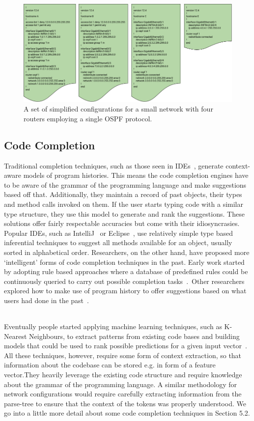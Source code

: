 \begin{figure}[H]
	\centering
	\includegraphics[width=5in]{configexample.png}
	\caption{A set of simplified configurations for a small network with four routers employing a single OSPF protocol.}
\end{figure}

\subsection{Code Completion}

Traditional completion techniques, such as those seen in IDEs~\cite{intelliJ-completion}, generate context-aware models of program histories.
This means the code completion engines have to be aware of the grammar of the programming language and make suggestions based off that. Additionally, they maintain a record of past objects, their types and method calls invoked on them. If the user starts typing code with a similar type structure, they use this model to generate and rank the suggestions. These solutions offer fairly respectable accuracies but come with their idiosyncrasies. Popular IDEs, such as IntelliJ~\cite{intelliJ} or Eclipse~\cite{eclipse}, use relatively simple type based inferential techniques to suggest all methods available for an object, usually sorted in alphabetical order. Researchers, on the other hand, have proposed more ‘intelligent’ forms of code completion techniques in the past. Early work started by adopting rule based approaches where a database of predefined rules could be continuously queried to carry out possible completion tasks~\cite{kaiser}.  Other researchers explored how to make use of program history to offer suggestions based on what users had done in the past~\cite{robbes}.\\  

Eventually people started applying machine learning techniques, such as K-Nearest Neighbours, to extract patterns from existing code bases and building models that could be used to rank possible predictions for a given input vector~\cite{bruch}. All these techniques, however, require some form of context extraction, so that information about the codebase can be stored e.g. in form of a feature vector.They heavily leverage the existing code structure and require knowledge about the grammar of the programming language. A similar methodology for network configurations would require carefully extracting information from the parse-tree to ensure that the context of the tokens was properly understood. We go into a little more detail about some code completion techniques in Section 5.2.

